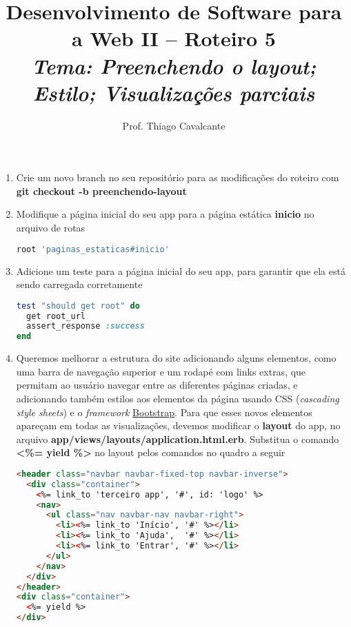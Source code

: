 \documentclass[a4paper,12pt]{article}
\title{Desenvolvimento de Software para a Web II -- Roteiro 5 \\
\Large \textit{Tema: Preenchendo o layout; Estilo; Visualizações parciais}}
\author{Prof. Thiago Cavalcante}
\date{}
\begin{document}
\maketitle

\sloppy
\raggedright

\begin{enumerate}
  \item Crie um novo branch no seu repositório para as modificações do roteiro com \textbf{git checkout -b preenchendo-layout}

  \item Modifique a página inicial do seu app para a página estática \textbf{inicio} no arquivo de rotas

  \begin{lstlisting}[language=Ruby, title={config/routes.rb}]
root 'paginas_estaticas#inicio'
  \end{lstlisting}

  \item Adicione um teste para a página inicial do seu app, para garantir que ela está sendo carregada corretamente

  \begin{lstlisting}[language=Ruby, title={test/controllers/paginas\_estaticas\_controller\_test.rb}]
test "should get root" do
  get root_url
  assert_response :success
end
  \end{lstlisting}

  \item Queremos melhorar a estrutura do site adicionando alguns elementos, como uma barra de navegação superior e um rodapé com links extras, que permitam ao usuário navegar entre as diferentes páginas criadas, e adicionando também estilos aos elementos da página usando CSS (\textit{cascading style sheets}) e o \textit{framework} \href{https://getbootstrap.com/docs/3.4/}{Bootstrap}. Para que esses novos elementos apareçam em todas as visualizações, devemos modificar o \textbf{layout} do app, no arquivo \textbf{app/views/layouts/application.html.erb}. Substitua o comando \textbf{<\%= yield \%>} no layout pelos comandos no quadro a seguir

  \begin{lstlisting}[language=html, title={app/views/layouts/application.html.erb}, basicstyle=\scriptsize]
<header class="navbar navbar-fixed-top navbar-inverse">
  <div class="container">
    <%= link_to 'terceiro app', '#', id: 'logo' %>
    <nav>
      <ul class="nav navbar-nav navbar-right">
        <li><%= link_to 'Início', '#' %></li>
        <li><%= link_to 'Ajuda',  '#' %></li>
        <li><%= link_to 'Entrar', '#' %></li>
      </ul>
    </nav>
  </div>
</header>
<div class="container">
  <%= yield %>
</div>
  \end{lstlisting}


\end{enumerate}
\end{document}

